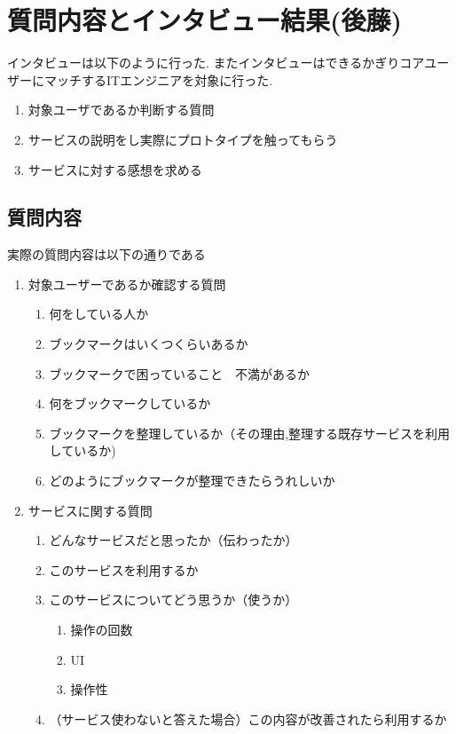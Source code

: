 \documentclass[a4paper,10pt,fleqn]{jsarticle}
\begin{document}
\section{質問内容とインタビュー結果(後藤)}
インタビューは以下のように行った. またインタビューはできるかぎりコアユーザーにマッチするITエンジニアを対象に行った.
\begin{enumerate}
  \item 対象ユーザであるか判断する質問
  \item サービスの説明をし実際にプロトタイプを触ってもらう
  \item サービスに対する感想を求める
\end{enumerate}

\subsection{質問内容}
実際の質問内容は以下の通りである
\begin{enumerate}
  \item 対象ユーザーであるか確認する質問
  \begin{enumerate}
    \item 何をしている人か
    \item ブックマークはいくつくらいあるか
    \item ブックマークで困っていること　不満があるか
    \item 何をブックマークしているか
    \item ブックマークを整理しているか（その理由,整理する既存サービスを利用しているか)
    \item どのようにブックマークが整理できたらうれしいか
  \end{enumerate}
  \item サービスに関する質問
  \begin{enumerate}
    \item どんなサービスだと思ったか（伝わったか）
    \item このサービスを利用するか
    \item このサービスについてどう思うか（使うか）
    \begin{enumerate}
      \item 操作の回数
      \item UI
      \item 操作性
    \end{enumerate}
    \item （サービス使わないと答えた場合）この内容が改善されたら利用するか
  \end{enumerate}
\end{enumerate}
\end{document}
